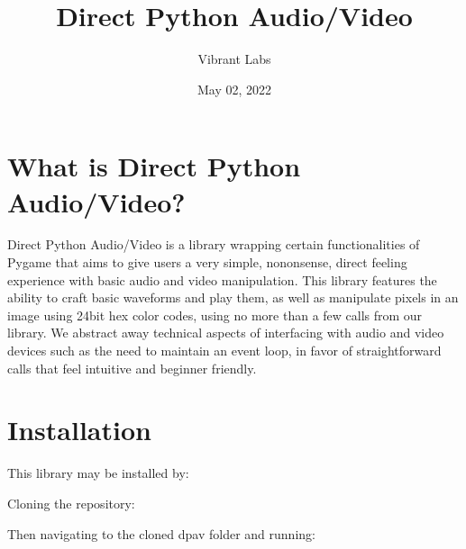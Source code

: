\documentclass[letterpaper,10pt,english,openany,oneside]{sphinxmanual}
\title{Direct Python Audio/Video}
\date{May 02, 2022}
\author{Vibrant Labs}
\begin{document}
\pagestyle{empty}
\sphinxmaketitle
\pagestyle{plain}
\sphinxtableofcontents
\pagestyle{normal}
\label{\detokenize{index::doc}}


\sphinxstepscope


\chapter{What is Direct Python Audio/Video?}
\label{\detokenize{fundamentals:what-is-direct-python-audio-video}}\label{\detokenize{fundamentals::doc}}
\sphinxAtStartPar
Direct Python Audio/Video is a library wrapping certain functionalities of Pygame that aims to give users a very simple, no\sphinxhyphen{}nonsense, direct feeling experience with basic audio and video manipulation. This library features the ability to craft basic waveforms and play them, as well as manipulate pixels in an image using 24\sphinxhyphen{}bit hex color codes, using no more than a few calls from our library. We abstract away technical aspects of interfacing with audio and video devices such as the need to maintain an event loop, in favor of straightforward calls that feel intuitive and beginner friendly.


\chapter{Installation}
\label{\detokenize{fundamentals:installation}}
\sphinxAtStartPar
This library may be installed by:

\sphinxAtStartPar
Cloning the repository:

\begin{sphinxVerbatim}[commandchars=\\\{\}]
  
\end{sphinxVerbatim}

\sphinxAtStartPar
Then navigating to the cloned dpav folder and running:

\begin{sphinxVerbatim}[commandchars=\\\{\}]
  
\end{sphinxVerbatim}
\end{document}
